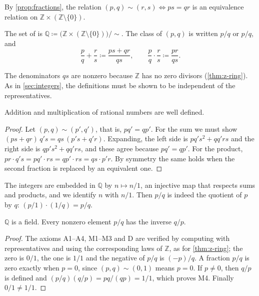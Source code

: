 By \cref{prop:fractions}, the relation $(p,q)\sim(r,s)\iff ps=qr$ is an equivalence relation on $\mathbb Z\times(\mathbb Z\setminus\{0\})$.

\begin{definition}
\label{def:rationals}
The set of  is $\mathbb Q\coloneqq\bigl(\mathbb Z\times(\mathbb Z\setminus\{0\})\bigr)/{\sim}$. The class of $(p,q)$ is written $p/q$ or $p/q$, and
\[
\frac pq+\frac rs\coloneqq\frac{ps+qr}{qs},\qquad\frac pq\cdot\frac rs\coloneqq\frac{pr}{qs}.
\]
\end{definition}

The denominators $qs$ are nonzero because $\mathbb Z$ has no zero divisors (\cref{thm:z-ring}). As in \cref{sec:integers}, the definitions must be shown to be independent of the representatives.

\begin{proposition}
\label{prop:q-well-defined}
Addition and multiplication of rational numbers are well defined.
\end{proposition}

\begin{proof}
Let $(p,q)\sim(p',q')$, that is, $pq'=qp'$. For the sum we must show $(ps+qr)\,q's=qs\,(p's+q'r)$. Expanding, the left side is $pq's^2+qq'rs$ and the right side is $qp's^2+qq'rs$, and these agree because $pq'=qp'$. For the product, $pr\cdot q's=pq'\cdot rs=qp'\cdot rs=qs\cdot p'r$. By symmetry the same holds when the second fraction is replaced by an equivalent one.
\end{proof}

The integers are embedded in $\mathbb Q$ by $n\mapsto n/1$, an injective map that respects sums and products, and we identify $n$ with $n/1$. Then $p/q$ is indeed the quotient of $p$ by $q$: $(p/1)\cdot(1/q)=p/q$.

\begin{theorem}
\label{thm:q-field}
$\mathbb Q$ is a field. Every nonzero element $p/q$ has the inverse $q/p$.
\end{theorem}

\begin{proof}
The axioms A1--A4, M1--M3 and D are verified by computing with representatives and using the corresponding laws of $\mathbb Z$, as for \cref{thm:z-ring}; the zero is $0/1$, the one is $1/1$ and the negative of $p/q$ is $(-p)/q$. A fraction $p/q$ is zero exactly when $p=0$, since $(p,q)\sim(0,1)$ means $p=0$. If $p\ne0$, then $q/p$ is defined and $(p/q)(q/p)=pq/(qp)=1/1$, which proves M4. Finally $0/1\ne1/1$.
\end{proof}

